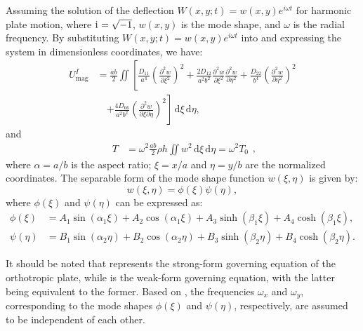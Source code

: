 \documentclass[preprint,12pt]{elsarticle}
\newcommand{\ii}{\mathrm{i}\mkern1mu}
\begin{document}
Assuming the solution of the deflection \( W(x, y; t) = w(x, y) e^{i \omega t} \) for harmonic plate motion, 
where \( \ii = \sqrt{-1} \), \( w(x, y) \) is the mode shape, and \( \omega \) is the radial frequency.  
By substituting \( W(x, y; t) = w(x, y) e^{i \omega t} \) into  and expressing the system in dimensionless coordinates, we have:
%
\begin{equation}\label{eq:poten_energy_mag}
	\begin{split}
		U_{\text{mag}}^{I} &= \frac{ab}{2} \iint \left[ \frac{D_{11}}{a^4} \left( \frac{\partial^2 w}{\partial \xi^2} \right)^2 + \frac{2 D_{12}}{a^2 b^2} \frac{\partial^2 w}{\partial \xi^2} \frac{\partial^2 w}{\partial \eta^2} + \frac{D_{22}}{b^4} \left( \frac{\partial^2 w}{\partial \eta^2} \right)^2 \right. \\
		&\quad \left. + \frac{4 D_{66}}{a^2 b^2} \left( \frac{\partial^2 w}{\partial \xi \partial \eta} \right)^2 \right] \, \mathrm{d} \xi \, \mathrm{d} \eta,
	\end{split}
\end{equation}
%
and
%
\begin{equation}\label{eq:kine_energy_mag}
	\begin{split}
		T &= \omega^2 \frac{ab}{2} \rho h \iint w^2 \, \mathrm{d} \xi \, \mathrm{d} \eta = \omega^2 T_0
	\end{split},
\end{equation}
%
where \( \alpha = a / b \) is the aspect ratio; \( \xi = x / a \) and \( \eta = y / b \) are the normalized coordinates.
The separable form of the mode shape function \( w(\xi, \eta) \) is given by:
%
\begin{equation}\label{eq:displace_func}
	w(\xi, \eta) = \phi(\xi) \psi(\eta),
\end{equation}
%
where \( \phi(\xi) \) and \( \psi(\eta) \) can be expressed as:
\begin{subequations}\label{eq:phi_psi_solution}
	\begin{align}
		\phi(\xi) &= A_1 \sin{(\alpha_1 \xi)} + A_2 \cos{(\alpha_1 \xi)} + A_3 \sinh{(\beta_1 \xi)} + A_4 \cosh{(\beta_1 \xi)},\label{eq:phi_solution1}\\
		\psi(\eta) &= B_1 \sin{(\alpha_2 \eta)} + B_2 \cos{(\alpha_2 \eta)} + B_3 \sinh{(\beta_2 \eta)} + B_4 \cosh{(\beta_2 \eta)}. \label{eq:phi_solution2}
	\end{align}
\end{subequations}

It should be noted that  represents the strong-form governing equation of the orthotropic plate, while  is the weak-form governing equation, with the latter being equivalent to the former.
Based on , the frequencies $\omega_x$ and $\omega_y$, corresponding to the mode shapes $\phi(\xi)$ and $\psi(\eta)$, respectively, are assumed to be independent of each other.
\end{document}
